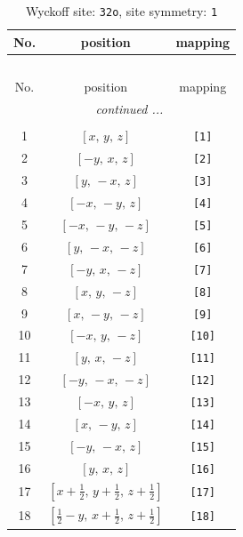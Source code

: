 \documentclass[fleqn,8pt]{jsarticle}
\begin{document}
\renewcommand{\arraystretch}{1.2}
\begin{longtable}{ccc}
\caption{Wyckoff site: {\tt 32o}, site symmetry: {\tt 1}}
 \\
 \hline \hline
No. & position & mapping \\ \hline \endfirsthead

\multicolumn{2}{l}{\tablename\ \thetable{}} \\
 \hline \hline
No. & position & mapping \\ \hline \endhead

 \hline \hline
\multicolumn{2}{r}{\footnotesize\it continued ...} \\ \endfoot

 \hline \hline
\multicolumn{2}{r}{} \\ \endlastfoot

1 & $\left[ x,\, y,\, z \right]$ & {\tt [1]} \\ \hline
2 & $\left[ - y,\, x,\, z \right]$ & {\tt [2]} \\ \hline
3 & $\left[ y,\, - x,\, z \right]$ & {\tt [3]} \\ \hline
4 & $\left[ - x,\, - y,\, z \right]$ & {\tt [4]} \\ \hline
5 & $\left[ - x,\, - y,\, - z \right]$ & {\tt [5]} \\ \hline
6 & $\left[ y,\, - x,\, - z \right]$ & {\tt [6]} \\ \hline
7 & $\left[ - y,\, x,\, - z \right]$ & {\tt [7]} \\ \hline
8 & $\left[ x,\, y,\, - z \right]$ & {\tt [8]} \\ \hline
9 & $\left[ x,\, - y,\, - z \right]$ & {\tt [9]} \\ \hline
10 & $\left[ - x,\, y,\, - z \right]$ & {\tt [10]} \\ \hline
11 & $\left[ y,\, x,\, - z \right]$ & {\tt [11]} \\ \hline
12 & $\left[ - y,\, - x,\, - z \right]$ & {\tt [12]} \\ \hline
13 & $\left[ - x,\, y,\, z \right]$ & {\tt [13]} \\ \hline
14 & $\left[ x,\, - y,\, z \right]$ & {\tt [14]} \\ \hline
15 & $\left[ - y,\, - x,\, z \right]$ & {\tt [15]} \\ \hline
16 & $\left[ y,\, x,\, z \right]$ & {\tt [16]} \\ \hline
17 & $\left[ x + \frac{1}{2},\, y + \frac{1}{2},\, z + \frac{1}{2} \right]$ & {\tt [17]} \\ \hline
18 & $\left[ \frac{1}{2} - y,\, x + \frac{1}{2},\, z + \frac{1}{2} \right]$ & {\tt [18]} \\ \hline

\end{longtable}
\end{document}
